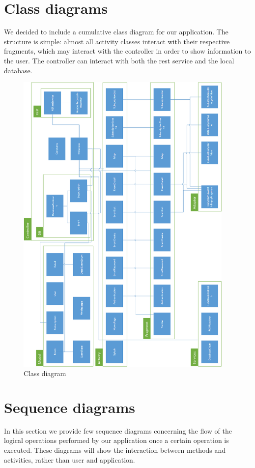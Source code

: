 \documentclass[a4paper]{scrreprt}
\begin{document}
\section{Class diagrams}
We decided to include a cumulative class diagram for our application. The structure is simple: almost all activity classes interact with their respective fragments, which may interact with the controller in order to show information to the user. The controller can interact with both the rest service and the local database. 
\begin{figure}[H]
 \centering
 \includegraphics[width=0.95\textwidth]{diagrams/class/class_diagram.png}
 \caption{Class diagram}
\end{figure}
\section{Sequence diagrams}
In this section we provide few sequence diagrams concerning the flow of the logical operations performed by our application once a certain operation is executed. These diagrams will show the interaction between methods and activities, rather than user and application.
\end{document}
